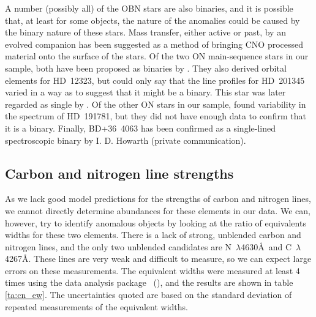 A number (possibly all) of the OBN stars are also binaries, and it is possible that,
at least for some objects, the nature of the anomalies could be caused
by the binary nature of these stars. Mass transfer, either active or
past, by an evolved companion has been suggested as a method of
bringing CNO processed material onto the surface of the stars. Of the
two ON main-sequence stars in our sample, both have been proposed as
binaries by . They also derived orbital elements for
HD~12323, but could only say that the line profiles for HD~201345
varied in a way as to suggest that it might be a binary. This star was
later regarded as single by . 
Of the other ON stars in our sample,  found variability
in the spectrum of HD~191781, but they did not have enough data to
confirm that it is a binary. Finally, BD+36~4063 has been confirmed as a
single-lined spectroscopic binary by I. D. Howarth (private communication).

\subsection{Carbon and nitrogen line strengths}
As we lack good model predictions for the strengths of carbon and
nitrogen lines, we cannot directly determine abundances for these
elements in our data. We can, however, try to identify anomalous
objects by looking at the ratio of equivalents widths for these two
elements. There is a lack of strong, unblended carbon and nitrogen
lines, and the only two unblended candidates are
N~$\lambda$4630\AA\ and C~$\lambda$4267\AA. These lines
are very weak and difficult to measure, so we can expect large errors
on these measurements. The equivalent widths were measured at least 4
times using the data analysis package \dipso\ (\cite{dipso}), and the
results are shown in table \ref{ta:cn_ew}. The uncertainties quoted
are based on the standard deviation of repeated measurements of the
equivalent widths.

